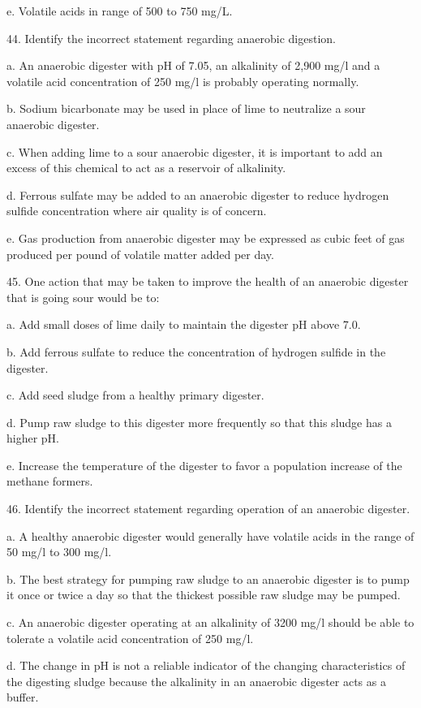 \documentclass{article}
\begin{document}
e. Volatile acids in range of 500 to 750 mg/L. 


44. Identify the incorrect statement regarding anaerobic digestion. 

a. An anaerobic digester with pH of 7.05, an alkalinity of 2,900 mg/l and a volatile acid concentration of 250 mg/l is probably operating normally. 

b. Sodium bicarbonate may be used in place of lime to neutralize a sour anaerobic digester. 

c. When adding lime to a sour anaerobic digester, it is important to add an excess of this chemical to act as a reservoir of alkalinity. 

d. Ferrous sulfate may be added to an anaerobic digester to reduce hydrogen sulfide concentration where air quality is of concern. 

e. Gas production from anaerobic digester may be expressed as cubic feet of gas produced per pound of volatile matter added per day. 


45. One action that may be taken to improve the health of an anaerobic digester that is going sour would be to: 

a. Add small doses of lime daily to maintain the digester pH above 7.0. 

b. Add ferrous sulfate to reduce the concentration of hydrogen sulfide in the digester. 

c. Add seed sludge from a healthy primary digester. 

d. Pump raw sludge to this digester more frequently so that this sludge has a higher pH. 

e. Increase the temperature of the digester to favor a population increase of the methane formers. 


46. Identify the incorrect statement regarding operation of an anaerobic digester. 

a. A healthy anaerobic digester would generally have volatile acids in the range of 50 mg/l to 300 mg/l. 

b. The best strategy for pumping raw sludge to an anaerobic digester is to pump it once or twice a day so that the thickest possible raw sludge may be pumped. 

c. An anaerobic digester operating at an alkalinity of 3200 mg/l should be able to tolerate a volatile acid concentration of 250 mg/l. 

d. The change in pH is not a reliable indicator of the changing characteristics of the digesting sludge because the alkalinity in an anaerobic digester acts as a buffer. 
\end{document}
